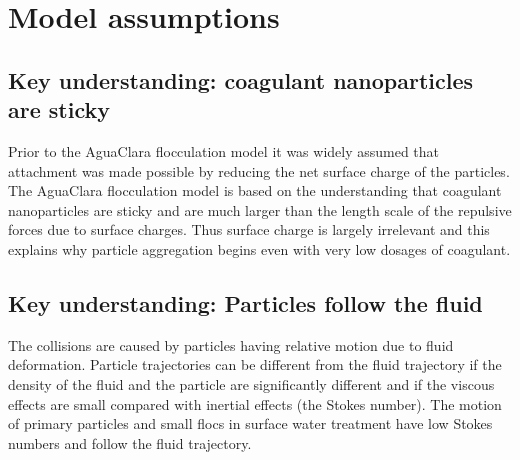 \documentclass[letterpaper,10pt,english]{sphinxmanual}
\begin{document}
\section{Model assumptions}
\label{\detokenize{Flocculation/Floc_Model:model-assumptions}}

\subsection{Key understanding: coagulant nanoparticles are sticky}
\label{\detokenize{Flocculation/Floc_Model:key-understanding-coagulant-nanoparticles-are-sticky}}
Prior to the AguaClara flocculation model it was widely assumed that attachment was made possible by reducing the net surface charge of the particles. The AguaClara flocculation model is based on the understanding that coagulant nanoparticles are sticky and are much larger than the length scale of the repulsive forces due to surface charges. Thus surface charge is largely irrelevant and this explains why particle aggregation begins even with very low dosages of coagulant.


\subsection{Key understanding: Particles follow the fluid}
\label{\detokenize{Flocculation/Floc_Model:key-understanding-particles-follow-the-fluid}}
The collisions are caused by particles having relative motion due to fluid deformation. Particle trajectories can be different from the fluid trajectory if the density of the fluid and the particle are significantly different and if the viscous effects are small compared with inertial effects (the Stokes number). The motion of primary particles and small flocs in surface water treatment have low Stokes numbers and follow the fluid trajectory.
\end{document}
